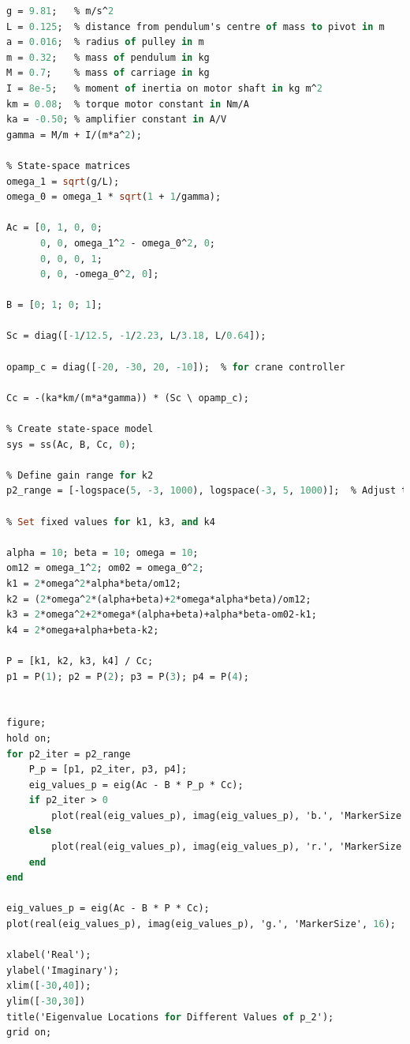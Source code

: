 \documentclass{article}
\begin{document}
\begin {lstlisting}[language=ML]
g = 9.81;   %
L = 0.125;  %
a = 0.016;  %
m = 0.32;   %
M = 0.7;    %
I = 8e-5;   %
km = 0.08;  %
ka = -0.50; %
gamma = M/m + I/(m*a^2);

omega_1 = sqrt(g/L);
omega_0 = omega_1 * sqrt(1 + 1/gamma);

Ac = [0, 1, 0, 0;
      0, 0, omega_1^2 - omega_0^2, 0;
      0, 0, 0, 1;
      0, 0, -omega_0^2, 0];

B = [0; 1; 0; 1];

Sc = diag([-1/12.5, -1/2.23, L/3.18, L/0.64]);

opamp_c = diag([-20, -30, 20, -10]);  %

Cc = -(ka*km/(m*a*gamma)) * (Sc \ opamp_c);

sys = ss(Ac, B, Cc, 0);

p2_range = [-logspace(5, -3, 1000), logspace(-3, 5, 1000)];  %


alpha = 10; beta = 10; omega = 10;
om12 = omega_1^2; om02 = omega_0^2;
k1 = 2*omega^2*alpha*beta/om12;
k2 = (2*omega^2*(alpha+beta)+2*omega*alpha*beta)/om12;
k3 = 2*omega^2+2*omega*(alpha+beta)+alpha*beta-om02-k1;
k4 = 2*omega+alpha+beta-k2;

P = [k1, k2, k3, k4] / Cc;
p1 = P(1); p2 = P(2); p3 = P(3); p4 = P(4);


figure;
hold on;
for p2_iter = p2_range
    P_p = [p1, p2_iter, p3, p4];
    eig_values_p = eig(Ac - B * P_p * Cc);
    if p2_iter > 0
        plot(real(eig_values_p), imag(eig_values_p), 'b.', 'MarkerSize', 8);
    else
        plot(real(eig_values_p), imag(eig_values_p), 'r.', 'MarkerSize', 8);
    end
end

eig_values_p = eig(Ac - B * P * Cc);
plot(real(eig_values_p), imag(eig_values_p), 'g.', 'MarkerSize', 16);

xlabel('Real');
ylabel('Imaginary');
xlim([-30,40]);
ylim([-30,30])
title('Eigenvalue Locations for Different Values of p_2');
grid on;

\end{lstlisting}
\end{document}
